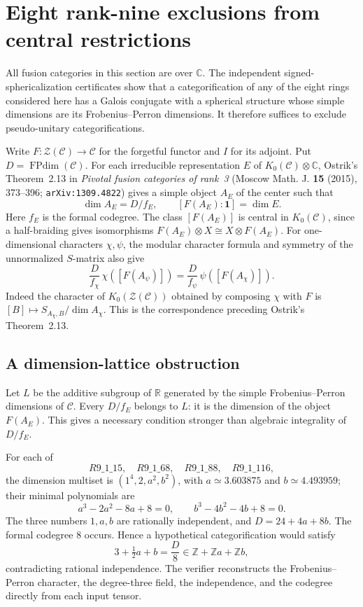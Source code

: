 \section{Eight rank-nine exclusions from central restrictions}
All fusion categories in this section are over $\mathbb C$. The independent
signed-sphericalization certificates show that a categorification of any of
the eight rings considered here has a Galois conjugate with a spherical
structure whose simple dimensions are its Frobenius--Perron dimensions.
It therefore suffices to exclude pseudo-unitary categorifications.

Write $F\colon\mathcal Z(\mathcal C)\to\mathcal C$ for the forgetful
functor and $I$ for its adjoint. Put $D=\operatorname{FPdim}(\mathcal C)$.
For each irreducible representation $E$ of $K_0(\mathcal C)\otimes\mathbb C$,
Ostrik's Theorem~2.13 in \emph{Pivotal fusion categories of rank~3}
(Moscow Math. J. \textbf{15} (2015), 373--396;
\texttt{arXiv:1309.4822}) gives a simple object $A_E$ of the center such that
\[
 \dim A_E=D/f_E,\qquad [F(A_E):\mathbf1]=\dim E.
\]
Here $f_E$ is the formal codegree. The class $[F(A_E)]$ is central in
$K_0(\mathcal C)$, since a half-braiding gives isomorphisms
$F(A_E)\otimes X\cong X\otimes F(A_E)$.
For one-dimensional characters $\chi,\psi$, the modular character formula
and symmetry of the unnormalized $S$-matrix also give
\begin{equation}\label{eq:central-reciprocity}
 \frac D{f_\chi}\,\chi([F(A_\psi)])
 =\frac D{f_\psi}\,\psi([F(A_\chi)]).
\end{equation}
Indeed the character of $K_0(\mathcal Z(\mathcal C))$ obtained by composing
$\chi$ with $F$ is $[B]\mapsto S_{A_\chi,B}/\dim A_\chi$.
This is the correspondence preceding Ostrik's Theorem~2.13.

\subsection{A dimension-lattice obstruction}
Let $L$ be the additive subgroup of $\mathbb R$ generated by the simple
Frobenius--Perron dimensions of $\mathcal C$. Every $D/f_E$ belongs to $L$:
it is the dimension of the object $F(A_E)$. This gives a necessary
condition stronger than algebraic integrality of $D/f_E$.

For each of
\[
 R9\_1\_15,\quad R9\_1\_68,\quad R9\_1\_88,\quad R9\_1\_116,
\]
the dimension multiset is $(1^4,2,a^2,b^2)$, with
$a\simeq3.603875$ and $b\simeq4.493959$; their minimal polynomials are
\[
 a^3-2a^2-8a+8=0,\qquad b^3-4b^2-4b+8=0.
\]
The three numbers $1,a,b$ are rationally independent, and
$D=24+4a+8b$. The formal codegree $8$ occurs. Hence a hypothetical
categorification would satisfy
\[
 3+\tfrac12a+b=\frac D8\in\mathbb Z+\mathbb Za+\mathbb Zb,
\]
contradicting rational independence. The verifier reconstructs the
Frobenius--Perron character, the degree-three field, the independence,
and the codegree directly from each input tensor.

